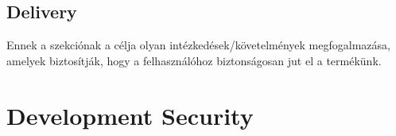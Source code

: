 \pagebreak[2]
\subsection{Delivery}

Ennek a szekciónak a célja olyan intézkedések/követelmények megfogalmazása, amelyek
biztosítják, hogy a felhasználóhoz biztonságosan jut el a termékünk.

\section{Development Security}

